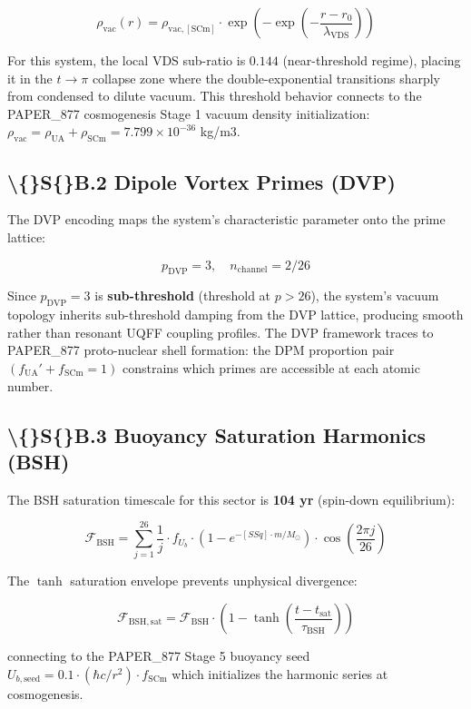 \documentclass[11pt]{article}
\begin{document}
$$\rho_{\mathrm{vac}}(r) = \rho_{\mathrm{vac,[SCm]}} \cdot \exp\!\left(-\exp\!\left(-\frac{r - r_0}{\lambda_{\mathrm{VDS}}}\right)\right)$$

For this system, the local VDS sub-ratio is $0.144$ (near-threshold regime), placing it in the $t \to \pi$ collapse zone where the double-exponential transitions sharply from condensed to dilute vacuum. This threshold behavior connects to the PAPER\_877 cosmogenesis Stage 1 vacuum density initialization: $\rho_{\mathrm{vac}} = \rho_{\mathrm{UA}} + \rho_{\mathrm{SCm}} = 7.799 \times 10^{-36}$ kg/m3.

\subsection*{\textbackslash\{\}S\{\}B.2 Dipole Vortex Primes (DVP)}

The DVP encoding maps the system's characteristic parameter onto the prime lattice:

$$p_{\mathrm{DVP}} = 3, \quad n_{\mathrm{channel}} = 2/26$$

Since $p_{\mathrm{DVP}} = 3$ is \textbf{sub-threshold} (threshold at $p > 26$), the system's vacuum topology inherits sub-threshold damping from the DVP lattice, producing smooth rather than resonant UQFF coupling profiles. The DVP framework traces to PAPER\_877 proto-nuclear shell formation: the DPM proportion pair $(f_{\mathrm{UA}}' + f_{\mathrm{SCm}} = 1)$ constrains which primes are accessible at each atomic number.

\subsection*{\textbackslash\{\}S\{\}B.3 Buoyancy Saturation Harmonics (BSH)}

The BSH saturation timescale for this sector is \textbf{104 yr} (spin-down equilibrium):

$$\mathcal{F}_{\mathrm{BSH}} = \sum_{j=1}^{26} \frac{1}{j} \cdot f_U_b \cdot \left(1 - e^{-[SSq] \cdot m/M_\odot}\right) \cdot \cos\!\left(\frac{2\pi j}{26}\right)$$

The $\tanh$ saturation envelope prevents unphysical divergence:

$$\mathcal{F}_{\mathrm{BSH,sat}} = \mathcal{F}_{\mathrm{BSH}} \cdot \left(1 - \tanh\!\left(\frac{t - t_{\mathrm{sat}}}{\tau_{\mathrm{BSH}}}\right)\right)$$

connecting to the PAPER\_877 Stage 5 buoyancy seed $U_{b,\mathrm{seed}} = 0.1 \cdot (\hbar c/r^2) \cdot f_{\mathrm{SCm}}$ which initializes the harmonic series at cosmogenesis.
\end{document}

